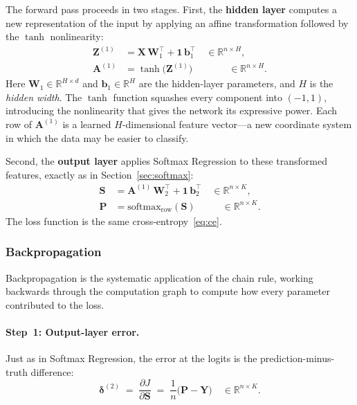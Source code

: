 \documentclass[11pt]{article}
\newcommand{\R}{\mathbb{R}}
\newcommand{\bX}{\mathbf{X}}
\newcommand{\bW}{\mathbf{W}}
\newcommand{\bb}{\mathbf{b}}
\newcommand{\bY}{\mathbf{Y}}
\newcommand{\bP}{\mathbf{P}}
\newcommand{\bS}{\mathbf{S}}
\newcommand{\bZ}{\mathbf{Z}}
\newcommand{\bA}{\mathbf{A}}
\newcommand{\bone}{\mathbf{1}}
\newcommand{\bdelta}{\boldsymbol{\delta}}
\begin{document}
The forward pass proceeds in two stages. First, the \textbf{hidden layer} computes a new representation of the input by applying an affine transformation followed by the $\tanh$ nonlinearity:
\begin{align}
  \bZ^{(1)} &= \bX\,\bW_1^\top + \bone\,\bb_1^\top \quad \in \R^{n \times H}, \label{eq:nn_Z1}\\
  \bA^{(1)} &= \tanh\!\bigl(\bZ^{(1)}\bigr) \qquad\quad\;\;\, \in \R^{n \times H}. \label{eq:nn_A1}
\end{align}
Here $\bW_1 \in \R^{H \times d}$ and $\bb_1 \in \R^{H}$ are the hidden-layer parameters, and $H$ is the \emph{hidden width}. The $\tanh$ function squashes every component into $(-1, 1)$, introducing the nonlinearity that gives the network its expressive power. Each row of $\bA^{(1)}$ is a learned $H$-dimensional feature vector---a new coordinate system in which the data may be easier to classify.

Second, the \textbf{output layer} applies Softmax Regression to these transformed features, exactly as in Section~\ref{sec:softmax}:
\begin{align}
  \bS &= \bA^{(1)}\,\bW_2^\top + \bone\,\bb_2^\top \quad \in \R^{n \times K}, \label{eq:nn_S}\\
  \bP &= \mathrm{softmax}_{\text{row}}(\bS) \qquad\;\;\, \in \R^{n \times K}. \label{eq:nn_P}
\end{align}
The loss function is the same cross-entropy~\eqref{eq:ce}.

\subsubsection*{Backpropagation}

Backpropagation is the systematic application of the chain rule, working backwards through the computation graph to compute how every parameter contributed to the loss.

\paragraph{Step~1: Output-layer error.}
Just as in Softmax Regression, the error at the logits is the prediction-minus-truth difference:
\begin{equation}\label{eq:nn_delta2}
  \bdelta^{(2)} \;=\; \frac{\partial J}{\partial \bS}
  \;=\; \frac{1}{n}\bigl(\bP - \bY\bigr) \quad \in \R^{n \times K}.
\end{equation}
\end{document}
